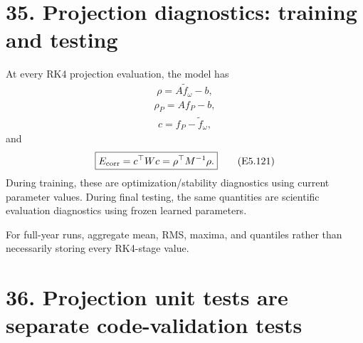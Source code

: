 \documentclass[11pt]{article}
\begin{document}
\section*{35. Projection diagnostics: training and testing}

At every RK4 projection evaluation, the model has
\begin{align}
\boxed{\rho=A\widetilde f_\omega-b,}
\tag{E5.118}
\end{align}
\begin{align}
\boxed{\rho_P=Af_P-b,}
\tag{E5.119}
\end{align}
\begin{align}
\boxed{c=f_P-\widetilde f_\omega,}
\tag{E5.120}
\end{align}
and
\begin{align}
\boxed{E_{\rm corr}=c^\top Wc=\rho^\top M^{-1}\rho.}
\tag{E5.121}
\end{align}
During training, these are optimization/stability diagnostics using current parameter values. During final testing, the same quantities are scientific evaluation diagnostics using frozen learned parameters.

For full-year runs, aggregate mean, RMS, maxima, and quantiles rather than necessarily storing every RK4-stage value.

\section*{36. Projection unit tests are separate code-validation tests}
\end{document}
